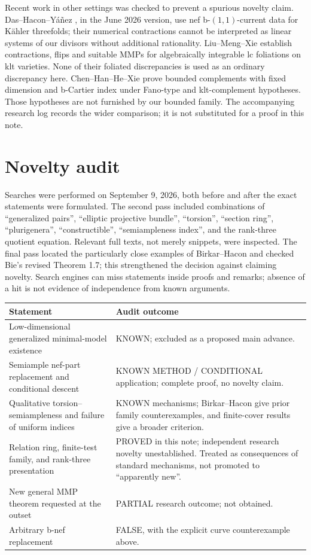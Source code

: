 \documentclass[12pt]{amsart}
\theoremstyle{definition}
\theoremstyle{remark}
\numberwithin{equation}{section}
\begin{document}
Recent work in other settings was checked to prevent a spurious novelty claim. Das--Hacon--Y\'a\~nez \cite[Theorems 1.1--1.6]{en-DHY}, in the June 2026 version, use nef b-$(1,1)$-current data for K\"ahler threefolds; their numerical contractions cannot be interpreted as linear systems of our divisors without additional rationality. Liu--Meng--Xie \cite[Theorems 1.2--1.4]{en-LMX} establish contractions, flips and suitable MMPs for algebraically integrable lc foliations on klt varieties. None of their foliated discrepancies is used as an ordinary discrepancy here. Chen--Han--He--Xie \cite[Theorem 1.1]{en-CHHX} prove bounded complements with fixed dimension and b-Cartier index under Fano-type and klt-complement hypotheses. Those hypotheses are not furnished by our bounded family. The accompanying research log records the wider comparison; it is not substituted for a proof in this note.

\section{Novelty audit}\label{en:audit}
Searches were performed on September 9, 2026, both before and after the exact statements were formulated. The second pass included combinations of ``generalized pairs'', ``elliptic projective bundle'', ``torsion'', ``section ring'', ``plurigenera'', ``constructible'', ``semiampleness index'', and the rank-three quotient equation. Relevant full texts, not merely snippets, were inspected. The final pass located the particularly close examples of Birkar--Hacon and checked Bie's revised Theorem 1.7; this strengthened the decision against claiming novelty. Search engines can miss statements inside proofs and remarks; absence of a hit is not evidence of independence from known arguments.

\begin{center}\small
\begin{tabular}{p{}p{}}
\toprule
Statement & Audit outcome\\
\midrule
Low-dimensional generalized minimal-model existence & KNOWN; excluded as a proposed main advance.\\
Semiample nef-part replacement and conditional descent & KNOWN METHOD / CONDITIONAL application; complete proof, no novelty claim.\\
Qualitative torsion--semiampleness and failure of uniform indices & KNOWN mechanisms; Birkar--Hacon give prior family counterexamples, and finite-cover results give a broader criterion.\\
Relation ring, finite-test family, and rank-three presentation & PROVED in this note; independent research novelty unestablished. Treated as consequences of standard mechanisms, not promoted to ``apparently new''.\\
New general MMP theorem requested at the outset & PARTIAL research outcome; not obtained.\\
Arbitrary b-nef replacement & FALSE, with the explicit curve counterexample above.\\
\bottomrule
\end{tabular}
\end{center}
\end{document}
